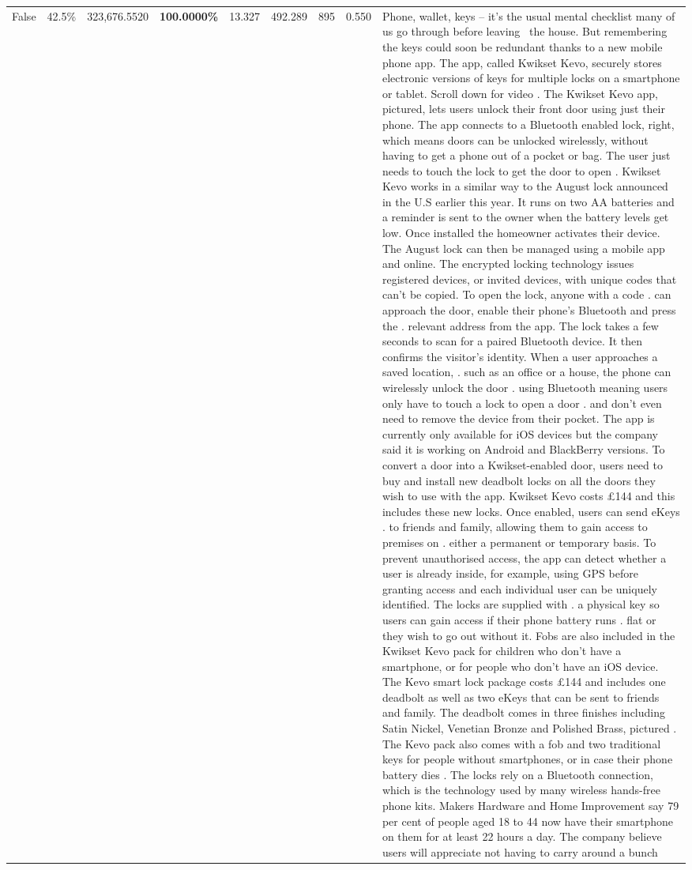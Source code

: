 \begin{table}[H]
\begin{tabular}{lllrlllll}
False & 42.5\% & 323,676.5520 & \bfseries \color{red} 100.0000\% & 13.327 & 492.289 & 895 & 0.550 & Phone, wallet, keys – it’s the usual mental checklist many of us go through before leaving  the house. But remembering the keys could soon be redundant thanks to a new mobile phone app. The app, called Kwikset Kevo, securely stores electronic versions of keys for multiple locks on a smartphone or tablet. Scroll down for video . The Kwikset Kevo app, pictured, lets users unlock their front door using just their phone. The app connects to a Bluetooth enabled lock, right, which means doors can be unlocked wirelessly, without having to get a phone out of a pocket or bag. The user just needs to touch the lock to get the door to open . Kwikset Kevo works in a similar way to the August lock announced in the U.S earlier this year. It runs on two AA batteries and a reminder is sent to the owner when the battery levels get low. Once installed the homeowner activates their device. The August lock can then be managed using a mobile app and online. The encrypted locking technology issues registered devices, or invited devices, with unique codes that can't be copied. To open the lock, anyone with a code . can approach the door, enable their phone's Bluetooth and press the . relevant address from the app. The lock takes a few seconds to scan for a paired Bluetooth device. It then confirms the visitor's identity. When a user approaches a saved location, . such as an office or a house, the phone can wirelessly unlock the door . using Bluetooth meaning users only have to touch a lock to open a door . and don't even need to remove the device from their pocket. The app is currently only available for iOS devices but the company said it is working on Android and BlackBerry versions. To convert a door into a Kwikset-enabled door, users need to buy and install new deadbolt locks on all the doors they wish to use with the app. Kwikset Kevo costs £144 and this includes these new locks. Once enabled, users can send eKeys . to friends and family, allowing them to gain access to premises on . either a permanent or temporary basis. To prevent unauthorised access, the app can detect whether a user is already inside, for example, using GPS before granting access and each individual user can be uniquely identified. The locks are supplied with . a physical key so users can gain access if their phone battery runs . flat or they wish to go out without it. Fobs are also included in the Kwikset Kevo pack for children who don't have a smartphone, or for people who don't have an iOS device. The Kevo smart lock package costs £144 and includes one deadbolt as well as two eKeys that can be sent to friends and family. The deadbolt comes in three finishes including Satin Nickel, Venetian Bronze and Polished Brass, pictured . The Kevo pack also comes with a fob and two traditional keys for people without smartphones, or in case their phone battery dies . The locks rely on a Bluetooth connection, which is the technology used by many wireless hands-free phone kits. Makers Hardware and Home Improvement say 79 per cent of people aged 18 to 44 now have their smartphone on them for at least 22 hours a day. The company believe users will appreciate not having to carry around a bunch 
\end{tabular}
\end{table}

